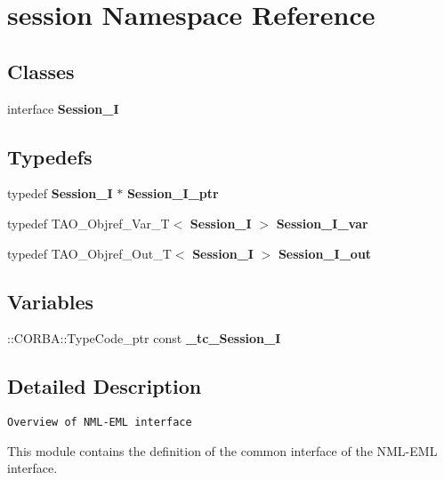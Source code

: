 \section{session Namespace Reference}
\label{namespacesession}
\subsection*{Classes}
\begin{DoxyCompactItemize}
\item 
interface {\bf Session\+\_\+I}
\end{DoxyCompactItemize}
\subsection*{Typedefs}
\begin{DoxyCompactItemize}
\item 
typedef {\bf Session\+\_\+I} $\ast$ {\bfseries Session\+\_\+\+I\+\_\+ptr}\label{namespacesession_a4b45ea247df061e022fd65902b13d755}

\item 
typedef T\+A\+O\+\_\+\+Objref\+\_\+\+Var\+\_\+T$<$ {\bf Session\+\_\+I} $>$ {\bfseries Session\+\_\+\+I\+\_\+var}\label{namespacesession_a76b2ffe7b90db6412c2c8531f3cce3ee}

\item 
typedef T\+A\+O\+\_\+\+Objref\+\_\+\+Out\+\_\+T$<$ {\bf Session\+\_\+I} $>$ {\bfseries Session\+\_\+\+I\+\_\+out}\label{namespacesession_a975e47a594adbb7e959fe25d58c365d1}

\end{DoxyCompactItemize}
\subsection*{Variables}
\begin{DoxyCompactItemize}
\item 
\+::C\+O\+R\+B\+A\+::\+Type\+Code\+\_\+ptr const {\bfseries \+\_\+tc\+\_\+\+Session\+\_\+I}
\end{DoxyCompactItemize}


\subsection{Detailed Description}
{\tt Overview of N\+M\+L-\/\+E\+ML interface}

This module contains the definition of the common interface of the N\+M\+L-\/\+E\+ML interface.

